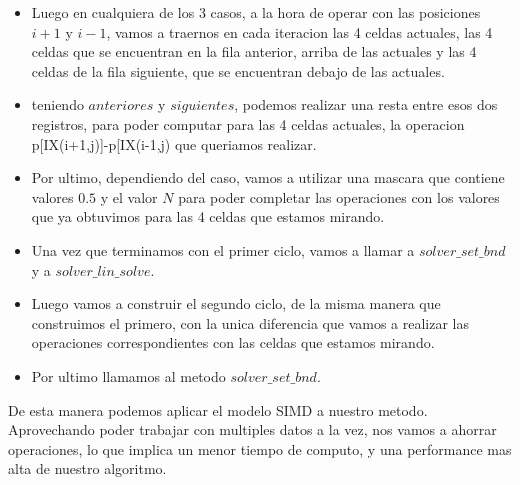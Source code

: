 \begin{itemize}
\item Luego en cualquiera de los 3 casos, a la hora de operar con las posiciones $i+1$ y $i-1$, vamos a traernos en cada iteracion las 4 celdas actuales, las 4 celdas que se encuentran en la fila anterior, arriba de las actuales y las 4 celdas de la fila siguiente, que se encuentran debajo de las actuales.
\item teniendo $anteriores$ y $siguientes$, podemos realizar una resta entre esos dos registros, para poder computar para las 4 celdas actuales, la operacion p[IX(i+1,j)]-p[IX(i-1,j) que queriamos realizar.
\item Por ultimo, dependiendo del caso, vamos a utilizar una mascara que contiene valores $0.5$ y el valor $N$ para poder completar las operaciones con los valores que ya obtuvimos para las 4 celdas que estamos mirando.
\item Una vez que terminamos con el primer ciclo, vamos a llamar a $solver\_set\_bnd$ y a $solver\_lin\_solve$.
\item Luego vamos a construir el segundo ciclo, de la misma manera que construimos el primero, con la unica diferencia que vamos a realizar las operaciones correspondientes con las celdas que estamos mirando.
\item Por ultimo llamamos al metodo $solver\_set\_bnd$.

\end{itemize}

De esta manera podemos aplicar el modelo SIMD a nuestro metodo. Aprovechando poder trabajar con multiples datos a la vez, nos vamos a ahorrar operaciones, lo que implica un menor tiempo de computo, y una performance mas alta de nuestro algoritmo.

 
